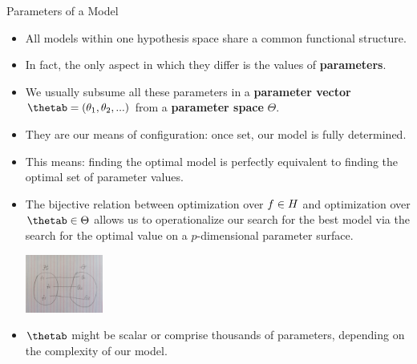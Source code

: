 \documentclass[11pt,compress,t,notes=noshow, xcolor=table]{beamer}
\begin{document}
\begin{vbframe}{Parameters of a Model}

\begin{itemize}
  
  \item All models within one hypothesis space share a common functional 
  structure.
  
  \item In fact, the only aspect in which they differ is the values of 
  \textbf{parameters}.
  
  \item We usually subsume all these parameters in a \textbf{parameter vector} 
  $\thetab = (\theta_1, \theta_2, ...)$ from a \textbf{parameter space} 
  $\Theta$.
  
  \item They are our means of configuration: once set, our model is 
  fully determined.
  
  
  \framebreak
  
  \item This means: finding the optimal model is perfectly equivalent to 
  finding the optimal set of parameter values.
  
  \item The bijective relation between optimization over $f \in H$ and 
  optimization over $\thetab \in \Theta$ allows us to operationalize our search
  for the best model via the search for the optimal value on a $p$-dimensional
  parameter surface.
  
  \begin{center}
    \includegraphics[width = 0.2\textwidth, angle = 90]{figure_man/bijection_placeholder.JPG} 
  \end{center}
  
  \item $\thetab$ might be scalar or comprise thousands of parameters,
  depending on the complexity of our model.
  
\end{itemize}

\end{vbframe}
\end{document}
